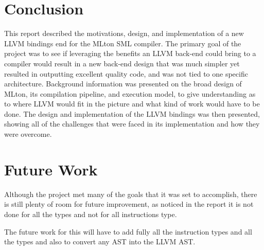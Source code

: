 \documentclass[openany]{book}
\begin{document}
\chapter{Conclusion}
This report described the motivations, design, and implementation of a new LLVM bindings end for the MLton SML compiler. The primary goal of the project was to see if leveraging the benefits an LLVM back-end could bring to a compiler would result in a new back-end design that was much simpler yet resulted in outputting excellent quality code, and was not tied to one specific architecture. \newline \newline Background information was presented on the broad design of MLton, its compilation pipeline, and execution model, to give understanding as to where LLVM would fit in the picture and what kind of work would have to be done. The design and implementation of the LLVM bindings was then presented, showing all of the challenges that were faced in its implementation and how they were overcome. 

\chapter{Future Work}
Although the project met many of the goals that it was set to accomplish, there is still plenty of  room  for  future  improvement,  as   noticed in the report it is not done for all the types and not for all instructions type. \newline

The future work for this will have to add fully all the instruction types and all the types and also to convert any AST into the LLVM AST.
 
\end{document}
